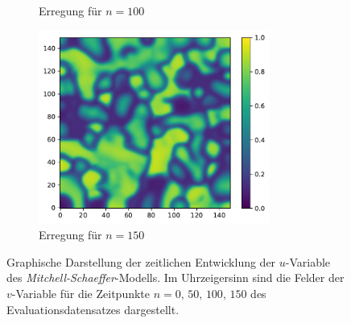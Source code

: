 \begin{appendices}
\begin{figure}[h]
\begin{subfigure}{.5\textwidth}
		\setcapmargin[1cm]{0.5cm}
		\caption{Erregung für $n=100$}
	\end{subfigure}%
	\begin{subfigure}{.5\textwidth}
		\centering
		\includegraphics[height=2.5in]{figures/results/dynamics/mitchell_150.pdf}
		\setcapmargin[1cm]{0.5cm}
		\caption{Erregung für $n=150$}
	\end{subfigure}
	\caption{Graphische Darstellung der zeitlichen Entwicklung der $u$-Variable des \textit{Mitchell-Schaeffer}-Modells. Im Uhrzeigersinn sind die Felder der $v$-Variable für die Zeitpunkte $n=0,\, 50,\, 100,\, 150$ des Evaluationsdatensatzes dargestellt.}
	\label{fig:apx_mitchell_evolution}
\end{figure} 


\end{appendices}
